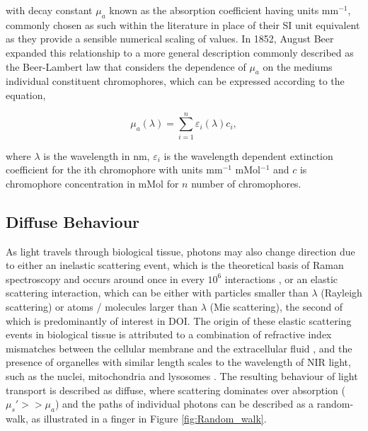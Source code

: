 \documentclass[twoside]{bhamthesis}
\theoremstyle{definition}
\begin{document}
with decay constant $\mu_a$ known as the absorption coefficient having units $\mathrm{mm^{-1}}$, commonly chosen as such within the literature in place of their SI unit equivalent as they provide a sensible numerical scaling of values. In 1852, August Beer expanded this relationship to a more general description commonly described as the Beer-Lambert law that considers the dependence of $\mu_a$ on the mediums individual constituent chromophores, which can be expressed according to the equation,

\begin{equation}
\mu _a (\lambda) = \sum_{i=1}^n \varepsilon_i (\lambda) c_i ,
  \label{eqn:RTE}
\end{equation}

where $\lambda$ is the wavelength in nm, $\varepsilon_i$ is the wavelength dependent extinction coefficient for the ith chromophore with units mm$^{-1}$ mMol$^{-1}$ and $c$ is chromophore concentration in mMol for $n$ number of chromophores.

\subsection{Diffuse Behaviour}

As light travels through biological tissue, photons may also change direction due to either an inelastic scattering event, which is the theoretical basis of Raman spectroscopy and occurs around once in every $\mathrm{10^6}$ interactions \cite{long1977raman}, or an elastic scattering interaction, which can be either with particles smaller than $\lambda$ (Rayleigh scattering) or atoms / molecules larger than $\lambda$ (Mie scattering), the second of which is predominantly of interest in DOI. The origin of these elastic scattering events in biological tissue is attributed to a combination of refractive index mismatches between the cellular membrane and the extracellular fluid \cite{mourant2000light}, and the presence of organelles with similar length scales to the wavelength of NIR light, such as the nuclei, mitochondria and lysosomes \cite{mourant2000light,beauvoit1994contribution,marina2012correlating}. The resulting behaviour of light transport is described as diffuse, where scattering dominates over absorption ($\mu_s' >> \mu_a$)  and the paths of individual photons can be described as a random-walk, as illustrated in a finger in Figure \ref{fig:Random_walk}.
\end{document}
